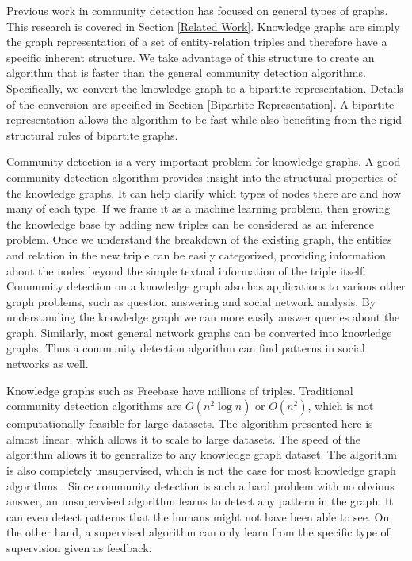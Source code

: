 \documentclass[12pt]{article}
\begin{document}
Previous work in community detection has focused on general types of graphs.
This research is covered in Section \ref{Related Work}. Knowledge graphs are
simply the graph representation of a set of entity-relation triples and
therefore have a specific inherent structure. We take advantage of this
structure to create an algorithm that is faster than the general community
detection algorithms. Specifically, we convert the knowledge graph to a
bipartite representation. Details of the conversion are specified in Section
\ref{Bipartite Representation}. A bipartite representation allows the algorithm
to be fast while also benefiting from the rigid structural rules of bipartite
graphs.

Community detection is a very important problem for knowledge graphs. A good
community detection algorithm provides insight into the structural properties of
the knowledge graphs. It can help clarify which types of nodes there are and how
many of each type. If we frame it as a machine learning problem, then growing
the knowledge base by adding new triples can be considered as an inference
problem. Once we understand the breakdown of the existing graph, the entities
and relation in the new triple can be easily categorized, providing information
about the nodes beyond the simple textual information of the triple itself.
Community detection on a knowledge graph also has applications to various other
graph problems, such as question answering and social network analysis. By
understanding the knowledge graph we can more easily answer queries about the
graph. Similarly, most general network graphs can be converted into knowledge
graphs. Thus a community detection algorithm can find patterns in social
networks as well.

Knowledge graphs such as Freebase \cite{Bollacker2008} have millions of triples.
Traditional community detection algorithms are $O(n^2 \log n)$ or $O(n^2)$,
which is not computationally feasible for large datasets. The algorithm
presented here is almost linear, which allows it to scale to large datasets. The
speed of the algorithm allows it to generalize to any knowledge graph dataset.
The algorithm is also completely unsupervised, which is not the case for most
knowledge graph algorithms \cite{Nickel2011, Bordes2013, Guo2015, Chang2014}.
Since community detection is such a hard problem with no obvious answer, an
unsupervised algorithm learns to detect any pattern in the graph. It can even
detect patterns that the humans might not have been able to see. On the other
hand, a supervised algorithm can only learn from the specific type of
supervision given as feedback.
\end{document}
